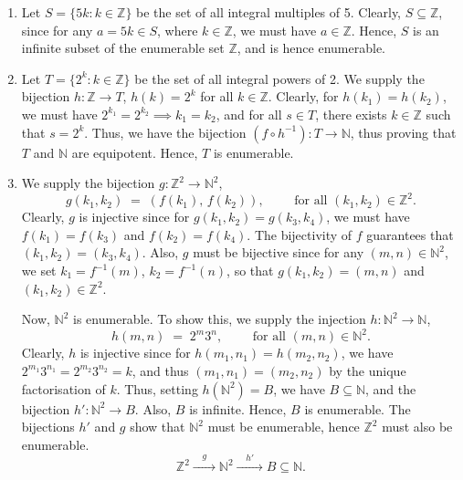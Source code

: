 \documentclass[10pt]{article}
\begin{document}
        \begin{enumerate}
                \item Let $S = \{5k: k \in \mathbb{Z}\}$ be the set of all integral multiples of 5. Clearly, $S \subseteq \mathbb{Z}$,
                since for any $a = 5k \in S$, where $k \in \mathbb{Z}$, we must have $a \in \mathbb{Z}$. Hence, $S$ is an infinite subset of
                the enumerable set $\mathbb{Z}$, and is hence enumerable.

                \item Let $T = \{2^k : k \in \mathbb{Z}\}$ be the set of all integral powers of 2. We supply the bijection
                $h \colon \mathbb{Z} \to T$, $h(k) = 2^k$ for all $k \in \mathbb{Z}$. Clearly, for $h(k_1) = h(k_2)$, we must have
                $2^{k_1} = 2^{k_2} \implies k_1 = k_2$, and for all $s \in T$, there exists $k \in \mathbb{Z}$ such that $s = 2^k$.
                Thus, we have the bijection $(f \circ h^{-1})\colon T \to \mathbb{N}$, thus proving that $T$ and $\mathbb{N}$ are equipotent.
                Hence, $T$ is enumerable.

                \item We supply the bijection $g\colon \mathbb{Z}^2 \to \mathbb{N}^2$,
                \[
                g(k_1, k_2) \;=\; (f(k_1),\, f(k_2)), \quad\quad\text{ for all } (k_1, k_2) \in \mathbb{Z}^2.
                \]
                Clearly, $g$ is injective since for $g(k_1, k_2) = g(k_3, k_4)$, we must have $f(k_1) = f(k_3)$ and $f(k_2) = f(k_4)$.
                The bijectivity of $f$ guarantees that $(k_1, k_2) = (k_3, k_4)$. Also, $g$ must be bijective since for any $(m, n) \in \mathbb{N}^2$,
                we set $k_1 = f^{-1}(m)$, $k_2 = f^{-1}(n)$, so that $g(k_1, k_2) = (m, n)$ and $(k_1, k_2) \in \mathbb{Z}^2$.

                Now, $\mathbb{N}^2$ is enumerable. To show this, we supply the injection $h\colon \mathbb{N}^2\to \mathbb{N}$,
                \[
                h(m, n) \;=\; 2^m 3^n, \quad\quad\text{ for all }(m, n) \in \mathbb{N}^2.
                \]
                Clearly, $h$ is injective since for $h(m_1, n_1) = h(m_2, n_2)$, we have $2^{m_1}3^{n_1} = 2^{m_2}3^{n_2} = k$, and thus
                $(m_1, n_1) = (m_2, n_2)$ by the unique factorisation of $k$. Thus, setting $h(\mathbb{N}^2) = B$, 
                we have $B \subseteq \mathbb{N}$, and the bijection $h'\colon \mathbb{N}^2 \to B$.
                Also, $B$ is infinite.
                Hence, $B$ is enumerable. The bijections $h'$ and $g$ show that $\mathbb{N}^2$ must
                be enumerable, hence $\mathbb{Z}^2$ must also be enumerable.
                \[
                \mathbb{Z}^2 \xrightarrow{\quad g\quad} \mathbb{N}^2 \xrightarrow{\quad h'\quad} B \subseteq \mathbb{N}.
                \]
        \end{enumerate}
\end{document}
